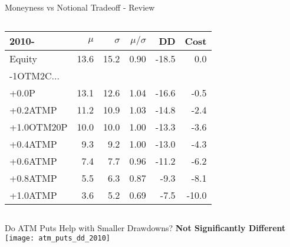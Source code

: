 \documentclass{beamer}
\begin{document}
\begin{frame}{Moneyness vs Notional Tradeoff - Review}
\begin{columns}
\begin{column}{0.5\textwidth}

\scalebox{0.7} {


\begin{tabular}{lrrrrr}
\toprule
2010- & $\mu$ & $\sigma$ & $\mu/\sigma$ & DD & Cost\\
\midrule
Equity & 13.6 & 15.2 & 0.90 & -18.5 & 0.0\\
\addlinespace
-1OTM2C...\\
+0.0P & 13.1 & 12.6 & 1.04 & -16.6 & -0.5\\
+0.2ATMP & 11.2 & 10.9 & 1.03 & -14.8 & -2.4\\
+1.0OTM20P & 10.0 & 10.0 & 1.00 & -13.3 & -3.6\\
+0.4ATMP & 9.3 & 9.2 & 1.00 & -13.0 & -4.3\\
+0.6ATMP & 7.4 & 7.7 & 0.96 & -11.2 & -6.2\\
+0.8ATMP & 5.5 & 6.3 & 0.87 & -9.3 & -8.1\\
+1.0ATMP & 3.6 & 5.2 & 0.69 & -7.5 & -10.0\\
\bottomrule
\end{tabular}

}

\end{column}

\end{columns}

\end{frame}


\begin{frame}{Do ATM Puts Help with Smaller Drawdowns? {\bf Not Significantly Different}}
\texttt{[image: atm\_puts\_dd\_2010]}
\end{frame}
\end{document}
